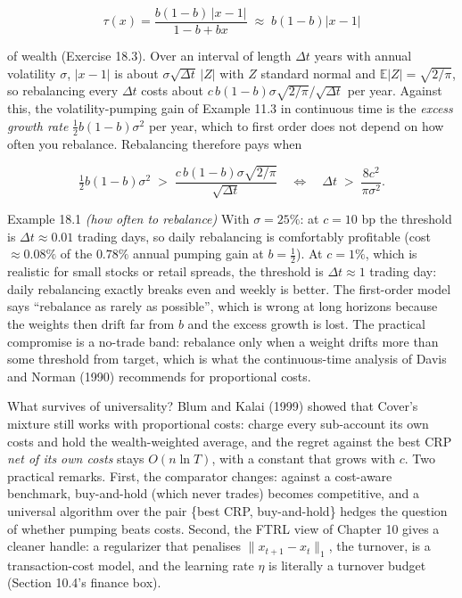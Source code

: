 \documentclass[11pt,a4paper,openany]{book}
\newcommand{\E}{\mathbb{E}}
\newcommand{\norm}[1]{\lVert #1\rVert}
\newcommand{\abs}[1]{\lvert #1\rvert}
\begin{document}
\[\tau(x)=\frac{b(1-b)\,\abs{x-1}}{1-b+bx}\;\approx\;b(1-b)\abs{x-1}\]

of wealth (Exercise 18.3). Over an interval of length $\Delta t$ years with annual volatility $\sigma$, $\abs{x-1}$ is about $\sigma\sqrt{\Delta t}\,\abs Z$ with $Z$ standard normal and $\E\abs Z=\sqrt{2/\pi}$, so rebalancing every $\Delta t$ costs about $c\,b(1-b)\sigma\sqrt{2/\pi}/\sqrt{\Delta t}$ per year. Against this, the volatility-pumping gain of Example 11.3 in continuous time is the \emph{excess growth rate} $\tfrac12b(1-b)\sigma^2$ per year, which to first order does not depend on how often you rebalance. Rebalancing therefore pays when

\[\tfrac12b(1-b)\sigma^2\;>\;\frac{c\,b(1-b)\sigma\sqrt{2/\pi}}{\sqrt{\Delta t}}\quad\Longleftrightarrow\quad\Delta t\;>\;\frac{8c^2}{\pi\sigma^2}.\]

\begin{bexample}{Example 18.1 \emph{(how often to rebalance)}}
With $\sigma=25\%$: at $c=10$ bp the threshold is $\Delta t\approx0.01$ trading days, so daily rebalancing is comfortably profitable (cost $\approx0.08\%$ of the $0.78\%$ annual pumping gain at $b=\tfrac12$). At $c=1\%$, which is realistic for small stocks or retail spreads, the threshold is $\Delta t\approx1$ trading day: daily rebalancing exactly breaks even and weekly is better. The first-order model says ``rebalance as rarely as possible'', which is wrong at long horizons because the weights then drift far from $b$ and the excess growth is lost. The practical compromise is a no-trade band: rebalance only when a weight drifts more than some threshold from target, which is what the continuous-time analysis of Davis and Norman (1990) recommends for proportional costs.
\end{bexample}

What survives of universality? Blum and Kalai (1999) showed that Cover's mixture still works with proportional costs: charge every sub-account its own costs and hold the wealth-weighted average, and the regret against the best CRP \emph{net of its own costs} stays $O(n\ln T)$, with a constant that grows with $c$. Two practical remarks. First, the comparator changes: against a cost-aware benchmark, buy-and-hold (which never trades) becomes competitive, and a universal algorithm over the pair \{best CRP, buy-and-hold\} hedges the question of whether pumping beats costs. Second, the FTRL view of Chapter 10 gives a cleaner handle: a regularizer that penalises $\norm{x_{t+1}-x_t}_1$, the turnover, is a transaction-cost model, and the learning rate $\eta$ is literally a turnover budget (Section 10.4's finance box).
\end{document}
